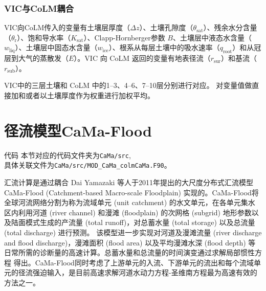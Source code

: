 \subsubsection{VIC与CoLM耦合} %

    VIC向CoLM传入的变量有土壤层厚度（$\Delta z$）、土壤孔隙度（$\theta_{\text{sat}}$）、残余水分含量（$\theta_\text{r}$）、饱和导水率（$K_{\text{sat}}$）、Clapp-Hornberger参数 $B$、土壤层中液态水含量（$w_{\text{liq}}$）、土壤层中固态水含量（$w_{\text{ice}}$）、根系从每层土壤中的吸水速率（$q_{\text{root}}$）和从冠层到大气的蒸散发（$E$）。VIC 向 CoLM 返回的变量有地表径流（$r_{\text{sur}}$）和基流（$r_{\text{sub}}$）。

    VIC中的三层土壤和 CoLM 中的1--3、4--6、7--10层分别进行对应。%
    对变量值做直接加和或者以土壤厚度作为权重进行加权平均。
%


\section{径流模型CaMa-Flood}
\begin{mymdframed}{代码}
  本节对应的代码文件夹为\texttt{CaMa/src},\\具体关联文件为\texttt{CaMa/src/MOD\_CaMa\_colmCaMa.F90}。
\end{mymdframed}

汇流计算是通过耦合 Dai Yamazaki 等人于2011年提出的大尺度分布式汇流模型 CaMa-Flood (Catchment-based Macro-scale Floodplain) 实现的\citep{yamazaki2011physically}。CaMa-Flood将全球河流网络分割为称为流域单元 (unit catchment) 的水文单元，在各单元集水区内利用河道 (river channel) 和漫滩 (floodplain) 的次网格 (subgrid) 地形参数以及陆面模式生成的产流量 (total runoff)，对总蓄水量 (total storage) 以及总流量 (total discharge) 进行预测。
该模型进一步实现对河道及漫滩流量 (river discharge and flood discharge)，漫滩面积 (flood area) 以及平均漫滩水深 (flood depth) 等日常所需的诊断量的高速计算。总蓄水量和总流量的时间演变通过求解局部惯性方程 \citep{bates2010} 得出。CaMa-Flood同时考虑了上游单元的入流、下游单元的流出和每个流域单元的径流强迫输入，是目前高速求解河道水动力方程-圣维南方程最为高速有效的方法之一。


